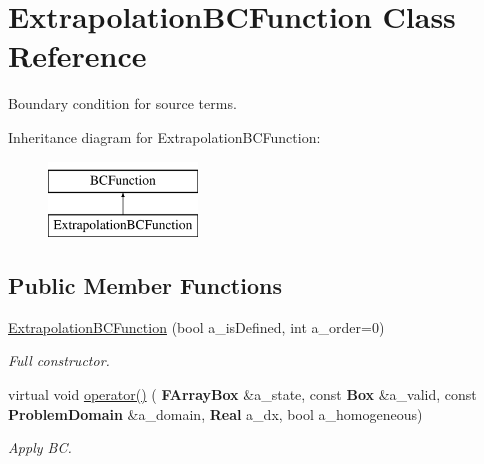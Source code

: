 \hypertarget{class_extrapolation_b_c_function}{}\section{Extrapolation\+B\+C\+Function Class Reference}
\label{class_extrapolation_b_c_function}


Boundary condition for source terms.  


Inheritance diagram for Extrapolation\+B\+C\+Function\+:\begin{figure}[H]
\begin{center}
\leavevmode
\includegraphics[height=2.000000cm]{class_extrapolation_b_c_function}
\end{center}
\end{figure}
\subsection*{Public Member Functions}
\begin{DoxyCompactItemize}
\item 
\mbox{\label{class_extrapolation_b_c_function_ab6747f91f0d3ee6d32634cae85f62dd8}} 
\hyperlink{class_extrapolation_b_c_function_ab6747f91f0d3ee6d32634cae85f62dd8}{Extrapolation\+B\+C\+Function} (bool a\+\_\+is\+Defined, int a\+\_\+order=0)
\begin{DoxyCompactList}\small\item\em Full constructor. \end{DoxyCompactList}\item 
\mbox{\label{class_extrapolation_b_c_function_a3d8d0ed4cda1a8beb61c5ac5817b36aa}} 
virtual void \hyperlink{class_extrapolation_b_c_function_a3d8d0ed4cda1a8beb61c5ac5817b36aa}{operator()} (\textbf{ F\+Array\+Box} \&a\+\_\+state, const \textbf{ Box} \&a\+\_\+valid, const \textbf{ Problem\+Domain} \&a\+\_\+domain, \textbf{ Real} a\+\_\+dx, bool a\+\_\+homogeneous)
\begin{DoxyCompactList}\small\item\em Apply BC. \end{DoxyCompactList}\end{DoxyCompactItemize}
